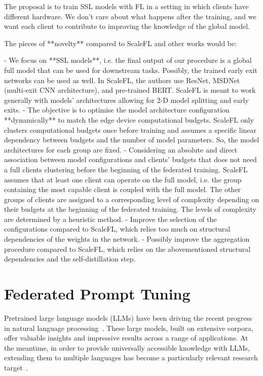 \documentclass[withindex,glossary]{cam-thesis}
\begin{document}
The proposal is to train SSL models with FL in a setting in which clients have different hardware. We don’t care about what happens after the training, and we want each client to contribute to improving the knowledge of the global model.

The pieces of **novelty** compared to ScaleFL and other works would be:

- We focus on **SSL models**, i.e. the final output of our procedure is a global full model that can be used for downstream tasks. Possibly, the trained early exit networks can be used as well. In ScaleFL, the authors use ResNet, MSDNet (multi-exit CNN architecture), and pre-trained BERT. ScaleFL is meant to work generally with models’ architectures allowing for 2-D model splitting and early exits.
- The objective is to optimise the model architecture configuration **dynamically** to match the edge device computational budgets. ScaleFL only clusters computational budgets once before training and assumes a specific linear dependency between budgets and the number of model parameters. So, the model architectures for each group are fixed.
- Considering an absolute and direct association between model configurations and clients’ budgets that does not need a full clients clustering before the beginning of the federated training. ScaleFL assumes that at least one client can operate on the full model, i.e. the group containing the most capable client is coupled with the full model. The other groups of clients are assigned to a corresponding level of complexity depending on their budgets at the beginning of the federated training. The levels of complexity are determined by a heuristic method.
- Improve the selection of the configurations compared to ScaleFL, which relies too much on structural dependencies of the weights in the network.
- Possibly improve the aggregation procedure compared to ScaleFL, which relies on the abovementioned structural dependencies and the self-distillation step.



\section{Federated Prompt Tuning}

Pretrained large language models (LLMs) have been driving the recent progress in natural language processing~\citep{brown2020language,chowdhery2022palm,anil2023palm,touvron2023llama,touvron2023llama2}. These large models, built on extensive corpora, offer valuable insights and impressive results across a range of applications. At the meantime, in order to provide universally accessible knowledge with LLMs, extending them to multiple languages has become a particularly relevant research target~\citep{XLM,XLM-R,artetxe-etal-2020-cross,pfeiffer-etal-2020-mad}. 
\end{document}

